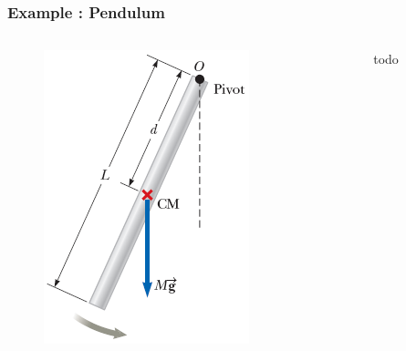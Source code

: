 \begin{frame}
	\frametitle{Example : Pendulum}
	\begin{columns}
		 \begin{column}{0.5\linewidth}
		 	\begin{figure}
			\centering
			\includegraphics[width=0.9\linewidth]{img/pendulum}
			\label{fig:pendulum}
			\end{figure}
		 \end{column}
		 \begin{column}{0.5\linewidth}
		 	todo
		 \end{column}
	\end{columns}
\end{frame}

